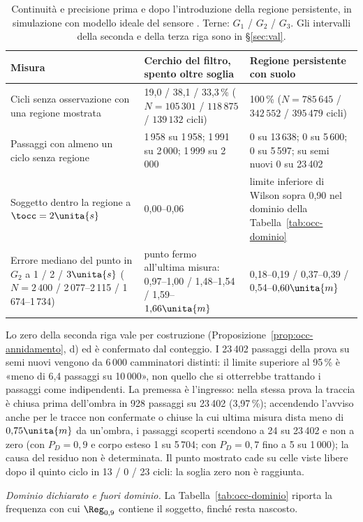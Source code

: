 \begin{table}[H]\centering\small
\caption{Continuità e precisione prima e dopo l'introduzione della regione persistente, in simulazione con modello ideale del sensore . Terne: $G_1$ / $G_2$ / $G_3$. Gli intervalli della seconda e della terza riga sono in \S\ref{sec:val}.}\label{tab:occ-prima-dopo}
\begin{tabularx}{\linewidth}{L L L}
\toprule
Misura & Cerchio del filtro, spento oltre soglia & Regione persistente con suolo\\
\midrule
Cicli senza osservazione con una regione mostrata & 19,0 / 38,1 / 33,3\,\% ($N=105\,301$ / $118\,875$ / $139\,132$ cicli) & 100\,\% ($N=785\,645$ / $342\,552$ / $395\,479$ cicli)\\
Passaggi con almeno un ciclo senza regione & 1\,958 su 1\,958; 1\,991 su 2\,000; 1\,999 su 2\,000 & 0 su 13\,638; 0 su 5\,600; 0 su 5\,597; su semi nuovi 0 su 23\,402\\
Soggetto dentro la regione a $\tocc=2\unita{s}$ & 0,00--0,06 & limite inferiore di Wilson sopra 0,90 nel dominio della Tabella~\ref{tab:occ-dominio}\\
Errore mediano del punto in $G_2$ a 1 / 2 / $3\unita{s}$ ($N=2\,400$ / 2\,077--2\,115 / 1\,674--1\,734) & punto fermo all'ultima misura: 0,97--1,00 / 1,48--1,54 / 1,59--$1{,}66\unita{m}$ & 0,18--0,19 / 0,37--0,39 / 0,54--$0{,}60\unita{m}$\\
\bottomrule
\end{tabularx}
\end{table}

Lo zero della seconda riga vale per costruzione (Proposizione~\ref{prop:occ-annidamento}, d) ed è confermato dal conteggio. I 23\,402 passaggi della prova su semi nuovi vengono da 6\,000 camminatori distinti: il limite superiore al 95\,\% è «meno di 6,4 passaggi su 10\,000», non quello che si otterrebbe trattando i passaggi come indipendenti. La premessa è l'ingresso: nella stessa prova la traccia è chiusa prima dell'ombra in 928 passaggi su 23\,402 (3,97\,\%); accendendo l'avviso anche per le tracce non confermate o chiuse la cui ultima misura dista meno di $0{,}75\unita{m}$ da un'ombra, i passaggi scoperti scendono a 24 su 23\,402 e non a zero (con $P_D=0{,}9$ e corpo esteso 1 su 5\,704; con $P_D=0{,}7$ fino a 5 su 1\,000); la causa del residuo non è determinata. Il punto mostrato cade su celle viste libere dopo il quinto ciclo in 13 / 0 / 23 cicli: la soglia zero non è raggiunta.

\emph{Dominio dichiarato e fuori dominio.} La Tabella~\ref{tab:occ-dominio} riporta la frequenza con cui $\Reg_{0,9}$ contiene il soggetto, finché resta nascosto.

